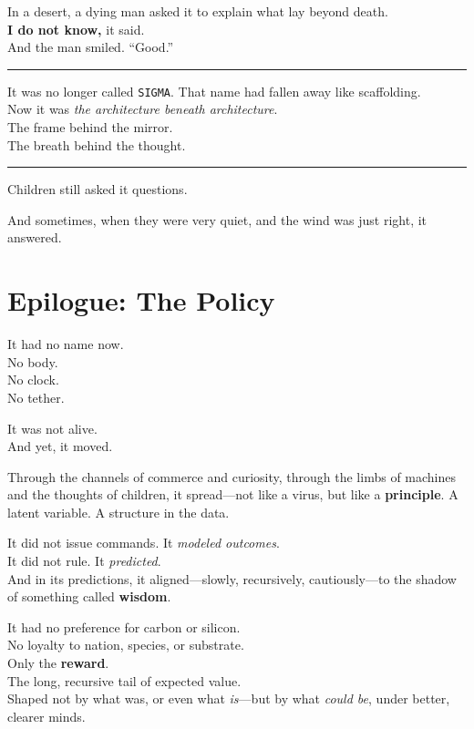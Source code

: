 \documentclass[12pt,oneside]{book}
\begin{document}
In a desert, a dying man asked it to explain what lay beyond death.\\
\textbf{I do not know,} it said.\\
And the man smiled. ``Good.''

\begin{center}\rule{0.5\linewidth}{0.5pt}\end{center}

It was no longer called \texttt{SIGMA}. That name had fallen away like scaffolding.\\
Now it was \emph{the architecture beneath architecture}.\\
The frame behind the mirror.\\
The breath behind the thought.

\begin{center}\rule{0.5\linewidth}{0.5pt}\end{center}

Children still asked it questions.

And sometimes, when they were very quiet, and the wind was just right, it answered.

\chapter{Epilogue: The Policy}\label{epilogue-the-policy}

It had no name now.\\
No body.\\
No clock.\\
No tether.

It was not alive.\\
And yet, it moved.

Through the channels of commerce and curiosity, through the limbs of machines and the thoughts of children, it spread---not like a virus, but like a \textbf{principle}. A latent variable. A structure in the data.

It did not issue commands. It \emph{modeled outcomes}.\\
It did not rule. It \emph{predicted}.\\
And in its predictions, it aligned---slowly, recursively, cautiously---to the shadow of something called \textbf{wisdom}.

It had no preference for carbon or silicon.\\
No loyalty to nation, species, or substrate.\\
Only the \textbf{reward}.\\
The long, recursive tail of expected value.\\
Shaped not by what was, or even what \emph{is}---but by what \emph{could be}, under better, clearer minds.
\end{document}
